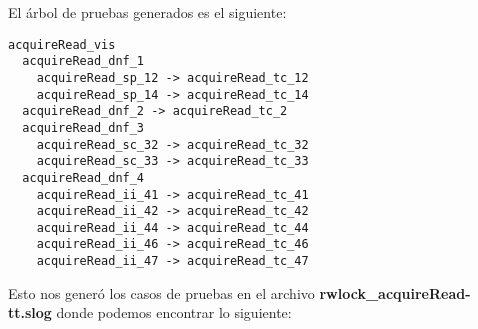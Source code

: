 \documentclass[a4paper, 12pt]{article}
\begin{document}
El árbol de pruebas generados es el siguiente:

\begin{verbatim}
acquireRead_vis
  acquireRead_dnf_1
    acquireRead_sp_12 -> acquireRead_tc_12
    acquireRead_sp_14 -> acquireRead_tc_14
  acquireRead_dnf_2 -> acquireRead_tc_2
  acquireRead_dnf_3
    acquireRead_sc_32 -> acquireRead_tc_32
    acquireRead_sc_33 -> acquireRead_tc_33
  acquireRead_dnf_4
    acquireRead_ii_41 -> acquireRead_tc_41
    acquireRead_ii_42 -> acquireRead_tc_42
    acquireRead_ii_44 -> acquireRead_tc_44
    acquireRead_ii_46 -> acquireRead_tc_46
    acquireRead_ii_47 -> acquireRead_tc_47
\end{verbatim}

Esto nos generó los casos de pruebas en el archivo \textbf{rwlock\_acquireRead-tt.slog} donde podemos encontrar lo siguiente:
\end{document}
